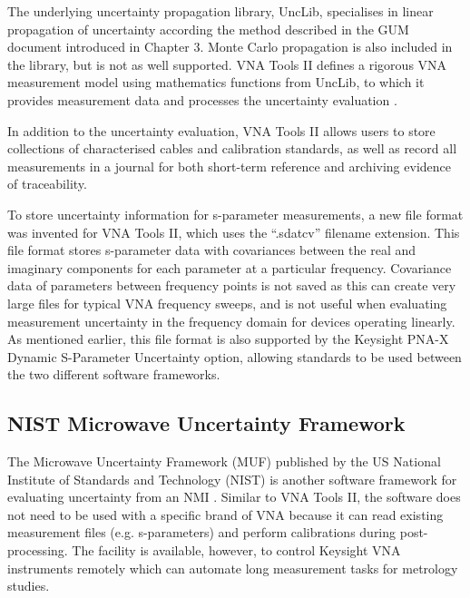\documentclass[../thesis/thesis.tex]{subfiles}
\begin{document}
\begin{refsection}
The underlying uncertainty propagation library, UncLib, specialises in linear propagation of uncertainty according the method described in the GUM document introduced in Chapter 3. Monte Carlo propagation is also included in the library, but is not as well supported. VNA Tools II defines a rigorous VNA measurement model using mathematics functions from UncLib, to which it provides measurement data and processes the uncertainty evaluation \cite{Wollensack_2012}.

In addition to the uncertainty evaluation, VNA Tools II allows users to store collections of characterised cables and calibration standards, as well as record all measurements in a journal for both short-term reference and archiving evidence of traceability.

To store uncertainty information for s-parameter measurements, a new file format was invented for VNA Tools II, which uses the ``.sdatcv'' filename extension. This file format stores s-parameter data with covariances between the real and imaginary components for each parameter at a particular frequency. Covariance data of parameters between frequency points is not saved as this can create very large files for typical VNA frequency sweeps, and is not useful when evaluating measurement uncertainty in the frequency domain for devices operating linearly. As mentioned earlier, this file format is also supported by the Keysight PNA-X Dynamic S-Parameter Uncertainty option, allowing standards to be used between the two different software frameworks.

\subsection{NIST Microwave Uncertainty Framework}

The Microwave Uncertainty Framework (MUF) published by the US National Institute of Standards and Technology (NIST) is another software framework for evaluating uncertainty from an NMI \cite{MUFWebsite, Ginley_2016, Ginley_2017}. Similar to VNA Tools II, the software does not need to be used with a specific brand of VNA because it can read existing measurement files (e.g. s-parameters) and perform calibrations during post-processing. The facility is available, however, to control Keysight VNA instruments remotely which can automate long measurement tasks for metrology studies.


\end{refsection}
\end{document}
